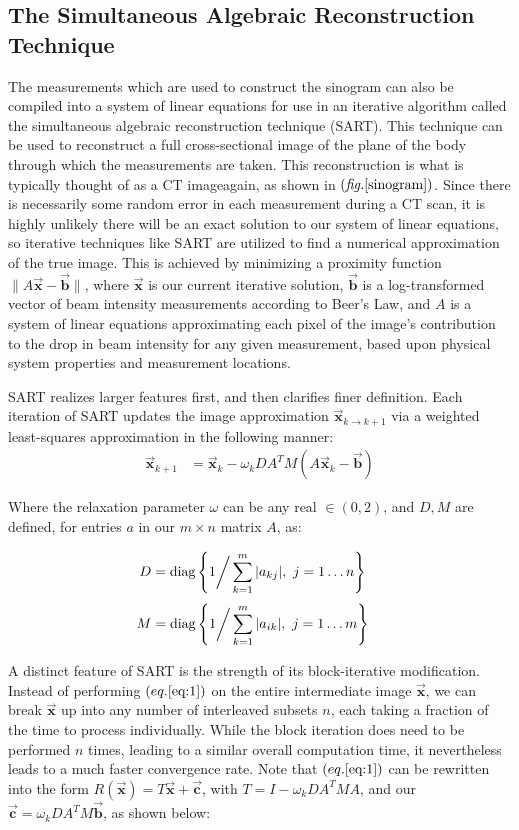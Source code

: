 \documentclass[sigconf,twocolumn,nonacm=true]{acmart}
\newcommand{\tighten}{\vspace*{-6pt plus -2pt minus -2pt}} %
\newcommand{\emd}{\text{\textemdash}} %
\newcommand{\enc}[1]{\left( #1 \right)} %
\newcommand{\embrace}[1]{\left\lbrace #1 \right\rbrace} %
\newcommand{\vvec}[1]{\vec{\boldsymbol{#1}}} %
\newcommand{\norm}[1]{\lVert #1 \rVert} %
\newcommand{\ds}{\displaystyle} %
\newcommand{\lump}[1]{\mathclap{\substack{#1}}} %
\newcommand{\Sum}[2]{\ds\sum_{\lump{#1}}^{\lump{#2}}} %
\newcommand{\fig}[1]{$\enc{\textit{fig.}\ref{#1}}$}
\begin{document}
\subsection{The Simultaneous Algebraic Reconstruction Technique}\tighten
The measurements which are used to construct the sinogram can also be compiled into a system of linear equations for use in an iterative algorithm called the simultaneous algebraic reconstruction technique (SART)\cite{andersen1984simultaneous}. This technique can be used to reconstruct a full cross-sectional image of the plane of the body through which the measurements are taken. This reconstruction is what is typically thought of as a CT image\emd again, as shown in \fig{sinogram}. Since there is necessarily some random error in each measurement during a CT scan, it is highly unlikely there will be an exact solution to our system of linear equations, so iterative techniques like SART are utilized to find a numerical approximation of the true image. This is achieved by minimizing a proximity function $\norm{A\vvec{x}-\vvec{b}}$, where $\vvec{x}$ is our current iterative solution, $\vvec{b}$ is a log-transformed vector of beam intensity measurements according to Beer’s Law, and $A$ is a system of linear equations approximating each pixel of the image's contribution to the drop in beam intensity for any given measurement, based upon physical system properties and measurement locations.

SART realizes larger features first, and then clarifies finer definition. Each iteration of SART updates the image approximation $\vvec{x}_{k\to k+1}$ via a weighted least-squares approximation in the following manner\cite{humphries2020comparison}:
\begin{align}
    \vvec{x}_{k+1} &= \vvec{x}_k - \omega_k D A^T M(A\vvec{x}_k-\vvec{b})\label{eq:1}
\end{align}\tighten\tighten

Where the relaxation parameter $\omega$ can be any real $\in(0,2)$, and $D,M$ are defined, for entries $a$ in our $m\times n$ matrix $A$, as:

\tighten
\begin{align}
    D &= \text{diag}\embrace{ 1 \bigg/ \Sum{k=1}{m} |a_{kj}| ,~j=1\dots n}
\end{align}\tighten
\begin{align}
    M &= \text{diag}\embrace{ 1 \bigg/ \Sum{k=1}{m} |a_{ik}| ,~j=1\dots m}
\end{align}

A distinct feature of SART is the strength of its block-iterative modification. Instead of performing $\enc{eq.\ref{eq:1}}$ on the entire intermediate image $\vvec{x}$, we can break $\vvec{x}$ up into any number of interleaved subsets $n$, each taking a fraction of the time to process individually. While the block iteration does need to be performed $n$ times, leading to a similar overall computation time, it nevertheless leads to a much faster convergence rate. Note that $\enc{eq.\ref{eq:1}}$ can be rewritten into the form $R(\vvec{x}) = T\vvec{x} + \vvec{c}$, with $T=I - \omega_k D A^T MA$, and our $\vvec{c}=\omega_k D A^T M\vvec{b}$, as shown below:
\end{document}
